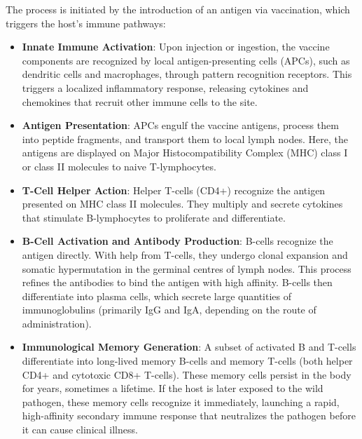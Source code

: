 The process is initiated by the introduction of an antigen via vaccination, which triggers the host's immune pathways:
\begin{itemize}
    \item \textbf{Innate Immune Activation}: Upon injection or ingestion, the vaccine components are recognized by local antigen-presenting cells (APCs), such as dendritic cells and macrophages, through pattern recognition receptors. This triggers a localized inflammatory response, releasing cytokines and chemokines that recruit other immune cells to the site.
    \item \textbf{Antigen Presentation}: APCs engulf the vaccine antigens, process them into peptide fragments, and transport them to local lymph nodes. Here, the antigens are displayed on Major Histocompatibility Complex (MHC) class I or class II molecules to naive T-lymphocytes.
    \item \textbf{T-Cell Helper Action}: Helper T-cells (CD4+) recognize the antigen presented on MHC class II molecules. They multiply and secrete cytokines that stimulate B-lymphocytes to proliferate and differentiate.
    \item \textbf{B-Cell Activation and Antibody Production}: B-cells recognize the antigen directly. With help from T-cells, they undergo clonal expansion and somatic hypermutation in the germinal centres of lymph nodes. This process refines the antibodies to bind the antigen with high affinity. B-cells then differentiate into plasma cells, which secrete large quantities of immunoglobulins (primarily IgG and IgA, depending on the route of administration).
    \item \textbf{Immunological Memory Generation}: A subset of activated B and T-cells differentiate into long-lived memory B-cells and memory T-cells (both helper CD4+ and cytotoxic CD8+ T-cells). These memory cells persist in the body for years, sometimes a lifetime. If the host is later exposed to the wild pathogen, these memory cells recognize it immediately, launching a rapid, high-affinity secondary immune response that neutralizes the pathogen before it can cause clinical illness.
\end{itemize}

